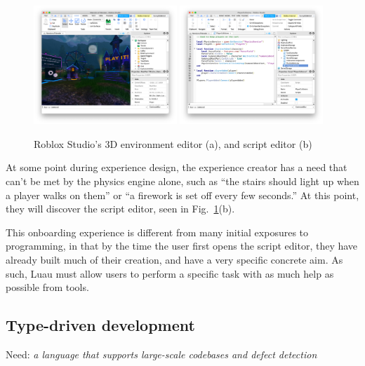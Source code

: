 \documentclass[acmsmall]{acmart}
\begin{document}
\begin{figure}
\includegraphics[width=0.48\textwidth]{studio-mow.png}
\includegraphics[width=0.48\textwidth]{studio-script-editor.png}
\caption{Roblox Studio's 3D environment editor (a), and script editor (b)}
\label{fig:studio}
\end{figure}

At some point during experience design, the experience creator has a need
that can't be met by the physics engine alone, such as ``the stairs should
light up when a player walks on them'' or ``a firework is set off
every few seconds.'' At this point, they will discover the script
editor, seen in Fig.~\ref{fig:studio}(b).

This onboarding experience is different from many initial exposures to
programming, in that by the time the user first opens the script
editor, they have already built much of their creation, and have a
very specific concrete aim. As such, Luau must allow users to perform a
specific task with as much help as possible from tools.

\subsection{Type-driven development}

Need: \emph{a language that supports large-scale codebases and defect detection}
\end{document}
